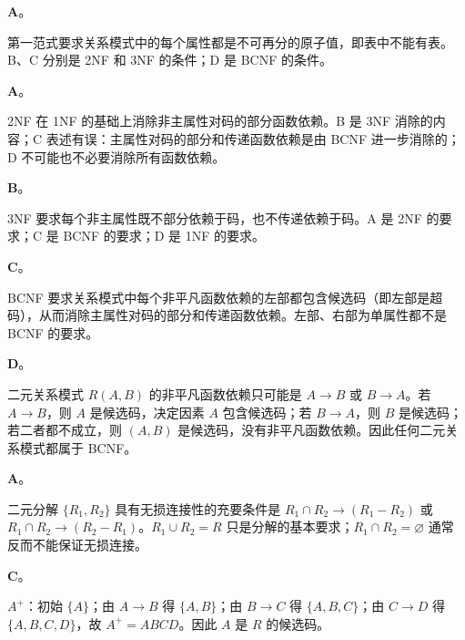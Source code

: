 \documentclass[a4paper,11pt]{article}
\begin{document}


\q \textbf{A}。\begin{analysis}第一范式要求关系模式中的每个属性都是不可再分的原子值，即表中不能有表。B、C 分别是 2NF 和 3NF 的条件；D 是 BCNF 的条件。\end{analysis}

\q \textbf{A}。\begin{analysis}2NF 在 1NF 的基础上消除非主属性对码的部分函数依赖。B 是 3NF 消除的内容；C 表述有误：主属性对码的部分和传递函数依赖是由 BCNF 进一步消除的；D 不可能也不必要消除所有函数依赖。\end{analysis}

\q \textbf{B}。\begin{analysis}3NF 要求每个非主属性既不部分依赖于码，也不传递依赖于码。A 是 2NF 的要求；C 是 BCNF 的要求；D 是 1NF 的要求。\end{analysis}

\q \textbf{C}。\begin{analysis}BCNF 要求关系模式中每个非平凡函数依赖的左部都包含候选码（即左部是超码），从而消除主属性对码的部分和传递函数依赖。左部、右部为单属性都不是 BCNF 的要求。\end{analysis}

\q \textbf{D}。\begin{analysis}二元关系模式 $R(A,B)$ 的非平凡函数依赖只可能是 $A\to B$ 或 $B\to A$。若 $A\to B$，则 $A$ 是候选码，决定因素 $A$ 包含候选码；若 $B\to A$，则 $B$ 是候选码；若二者都不成立，则 $(A,B)$ 是候选码，没有非平凡函数依赖。因此任何二元关系模式都属于 BCNF。\end{analysis}

\q \textbf{A}。\begin{analysis}二元分解 $\{R_1,R_2\}$ 具有无损连接性的充要条件是 $R_1\cap R_2\to(R_1-R_2)$ 或 $R_1\cap R_2\to(R_2-R_1)$。$R_1\cup R_2=R$ 只是分解的基本要求；$R_1\cap R_2=\varnothing$ 通常反而不能保证无损连接。\end{analysis}

\q \textbf{C}。\begin{analysis}$A^{+}$：初始 $\{A\}$；由 $A\to B$ 得 $\{A,B\}$；由 $B\to C$ 得 $\{A,B,C\}$；由 $C\to D$ 得 $\{A,B,C,D\}$，故 $A^{+}=ABCD$。因此 $A$ 是 $R$ 的候选码。\end{analysis}
\end{document}
